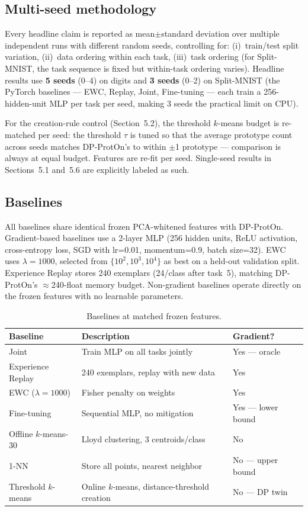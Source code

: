 \documentclass[11pt,a4paper]{article}
\begin{document}
\subsection{Multi-seed methodology}

Every headline claim is reported as mean$\pm$standard deviation over multiple independent runs with different random seeds, controlling for: (i)~train/test split variation, (ii)~data ordering within each task, (iii)~task ordering (for Split-MNIST, the task sequence is fixed but within-task ordering varies). Headline results use \textbf{5 seeds} (0--4) on digits and \textbf{3 seeds} (0--2) on Split-MNIST (the PyTorch baselines --- EWC, Replay, Joint, Fine-tuning --- each train a 256-hidden-unit MLP per task per seed, making 3 seeds the practical limit on CPU).

For the creation-rule control (Section~5.2), the threshold $k$-means budget is re-matched per seed: the threshold $\tau$ is tuned so that the average prototype count across seeds matches DP-ProtOn's to within $\pm$1 prototype --- comparison is always at equal budget. Features are re-fit per seed. Single-seed results in Sections~5.1 and~5.6 are explicitly labeled as such.

\subsection{Baselines}

All baselines share identical frozen PCA-whitened features with DP-ProtOn. Gradient-based baselines use a 2-layer MLP (256 hidden units, ReLU activation, cross-entropy loss, SGD with lr=0.01, momentum=0.9, batch size=32). EWC uses $\lambda{=}1000$, selected from $\{10^2,10^3,10^4\}$ as best on a held-out validation split. Experience Replay stores 240 exemplars (24/class after task~5), matching DP-ProtOn's $\approx$240-float memory budget. Non-gradient baselines operate directly on the frozen features with no learnable parameters.

\begin{table}[H]
\centering
\caption{Baselines at matched frozen features.}
\begin{tabular}{@{}lll@{}}
\toprule
Baseline & Description & Gradient? \\
\midrule
Joint & Train MLP on all tasks jointly & Yes --- oracle \\
Experience Replay & 240 exemplars, replay with new data & Yes \\
EWC ($\lambda{=}1000$) & Fisher penalty on weights & Yes \\
Fine-tuning & Sequential MLP, no mitigation & Yes --- lower bound \\
Offline $k$-means-30 & Lloyd clustering, 3 centroids/class & No \\
1-NN & Store all points, nearest neighbor & No --- upper bound \\
Threshold $k$-means & Online $k$-means, distance-threshold creation & No --- DP twin \\
\bottomrule
\end{tabular}
\end{table}
\end{document}

